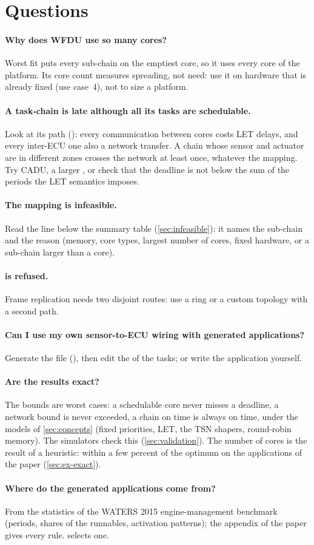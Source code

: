 \section{Questions}
\label{sec:faq}

\paragraph{Why does WFDU use so many cores?} Worst fit puts every
sub-chain on the emptiest core, so it uses every core of the platform. Its
core count measures spreading, not need: use it on hardware that is
already fixed (use case~4), not to size a platform.

\paragraph{A task-chain is late although all its tasks are schedulable.}
Look at its path (): every communication between cores costs
LET delays, and every inter-ECU one also a network transfer. A chain
whose sensor and actuator are in different zones crosses the network at
least once, whatever the mapping. Try CADU, a larger , or check
that the deadline is not below the sum of the periods the LET semantics
imposes.

\paragraph{The mapping is infeasible.} Read the line below the summary
table (\cref{sec:infeasible}): it names the sub-chain and the reason
(memory, core types, largest number of cores, fixed hardware, or a
sub-chain larger than a core).

\paragraph{ is refused.} Frame replication needs two disjoint
routes: use a ring or a custom topology with a second path.

\paragraph{Can I use my own sensor-to-ECU wiring with generated
applications?} Generate the file (), then edit the
 of the tasks; or write the application yourself.

\paragraph{Are the results exact?} The bounds are worst cases: a
schedulable core never misses a deadline, a network bound is never
exceeded, a chain on time is always on time, under the models of
\cref{sec:concepts} (fixed priorities, LET, the TSN shapers, round-robin
memory). The simulators check this (\cref{sec:validation}). The number of
cores is the result of a heuristic: within a few percent of the optimum
on the applications of the paper (\cref{sec:ex-exact}).

\paragraph{Where do the generated applications come from?} From the
statistics of the WATERS 2015 engine-management benchmark (periods, shares
of the runnables, activation patterns); the appendix of the paper gives
every rule.  selects one.
